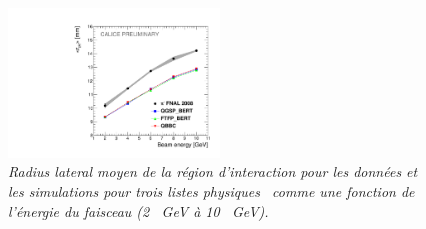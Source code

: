 \begin{figure}
	\centering
	\includegraphics[width=0.5\textwidth]{ECAL/plots/r-ir-graph.pdf}
	\caption{\label{fig:irrgraphF} \sl Radius lateral moyen de la région d'interaction pour les données et les simulations  pour trois listes physiques \geant\ comme une fonction de l'énergie du faisceau (2 \, GeV à 10 \, GeV).}
\end{figure}

